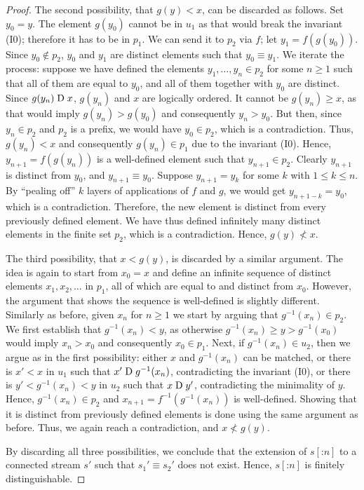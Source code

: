 \begin{proof}
  The second possibility, that $g(y)<x$, can be discarded as follows. Set $y_0=y$.
  The element $g(y_0)$
  cannot be in $u_1$ as that would break the invariant (I0); therefore it
  has to be in $p_1$. We can send it to $p_2$ via $f$; let
  $y_1=f(g(y_0))$.
  Since $y_0\notin p_2$, $y_0$ and $y_1$ are distinct elements such that
  $y_0\equiv y_1$.
  We iterate the process: suppose we have defined the elements $y_1, \ldots, y_n
  \in p_2$ for some $n\geq 1$ such that all of them are equal to $y_0$, and all of
  them together with $y_0$ are distinct.
  Since $g(y_n) \mathrel{\mathrm{D}} x$, $g(y_n)$ and $x$ are logically ordered. It cannot be
  $g(y_n)\geq x$, as
  that would imply $g(y_n) > g(y_0)$ and consequently $y_n>y_0$. But then,
  since
  $y_n\in p_2$ and $p_2$ is a prefix, we would have $y_0\in p_2$, which
  is a contradiction. Thus, $g(y_n)<x$ and consequently $g(y_n)\in p_1$ due to the
  invariant (I0). Hence, $y_{n+1}=f(g(y_n))$ is a well-defined element such
  that $y_{n+1}\in p_2$. Clearly $y_{n+1}$ is distinct from $y_0$, and
  $y_{n+1}\equiv y_0$. Suppose $y_{n+1}=y_{k}$ for some $k$ with $1\leq k \leq n$.
  By ``pealing off'' $k$ layers of applications of $f$ and $g$, we would
  get $y_{n+1-k}=y_0$, which is a contradiction. Therefore, the new element is
  distinct from every previously defined element. We have thus defined infinitely
  many distinct elements in the finite set $p_2$, which is a contradiction.
  Hence, $g(y) \nless x$.

  The third possibility, that $x<g(y)$, is discarded by a similar argument.
  The idea is again to start from $x_0=x$ and define an infinite sequence of
  distinct elements $x_1, x_2, \ldots$ in $p_1$, all of which are equal to and
  distinct from $x_0$. However, the argument that shows the
  sequence is well-defined is slightly different. Similarly as before,
  given $x_n$ for $n\geq 1$ we start by arguing that $g^{-1}(x_n)\in p_2$.
  We first establish that $g^{-1}(x_n)<y$, as otherwise
  $g^{-1}(x_n)\geq y > g^{-1}(x_0)$
  would imply $x_n > x_0$ and consequently $x_0\in p_1$. Next, if $g^{-1}(x_n)\in
  u_2$, then we argue as in the first possibility: either $x$ and $g^{-1}(x_n)$
  can be matched, or there is $x'<x$ in $u_1$ such that $x'\mathrel{\mathrm{D}} g^{-1}(x_n)$, contradicting the invariant (I0), or there is $y'<g^{-1}(x_n)<y$ in $u_2$ such
  that $x \mathrel{\mathrm{D}} y'$, contradicting the minimality of $y$. Hence, $g^{-1}(x_n)\in p_2$
  and $x_{n+1}=f^{-1}(g^{-1}(x_n))$ is well-defined. Showing that it is distinct from previously
  defined elements is done using the same argument as before. Thus, we again
  reach a contradiction, and $x \nless g(y)$.

  By discarding all three possibilities, we conclude that the extension of
  $s[\mathbin{:} n]$ to a connected stream $s'$ such that $s_1'\equiv s_2'$
  does not exist. Hence, $s[\mathbin{:} n]$ is finitely distinguishable.
\end{proof}

